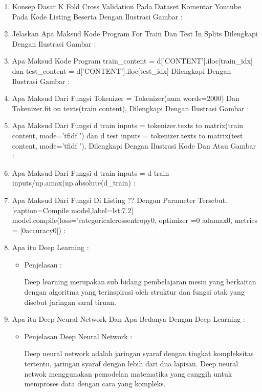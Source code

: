 \begin{enumerate}
\par
\par
\item Konsep Dasar K Fold Cross Validation Pada Dataset Komentar Youtube Pada Kode Listing Beserta Dengan Ilustrasi Gambar :
\item Jelaskan Apa Maksud Kode Program For Train Dan Test In Splits Dilengkapi Dengan Ilustrasi Gambar :
\item Apa Maksud Kode Program train\_content = d['CONTENT'].iloc[train\_idx] dan test\_content = d['CONTENT'].iloc[test\_idx] Dilengkapi Dengan Ilustrasi Gambar :
\item Apa Maksud Dari Fungsi Tokenizer = Tokenizer(num words=2000) Dan Tokenizer.fit on texts(train content), Dilengkapi Dengan Ilustrasi Gambar :
\item Apa Maksud Dari Fungsi d train inputs = tokenizer.texts to matrix(train content, mode=’tfidf ’) dan d test inputs = tokenizer.texts to matrix(test content, mode=’tfidf ’), Dilengkapi Dengan Ilustrasi Kode Dan Atau Gambar :
\item Apa Maksud Dari Fungsi d train inputs = d train inputs/np.amax(np.absolute(d\_train) :
\item Apa Maksud Dari Fungsi Di Listing ?? Dengan Parameter Tersebut. [caption=Compile model,label=lst:7.2] model.compile(loss=’categoricalcrossentropy0, optimizer =0 adamax0, metrics = [0accuracy0]) :
\par
\item Apa itu Deep Learning :
\begin{itemize}
\item Penjelasan :
\par Deep learning merupakan sub bidang pembelajaran mesin yang berkaitan dengan algoritma yang terinspirasi oleh struktur dan fungsi otak yang disebut jaringan saraf tiruan.
\par
\par
\par
\end{itemize}
\item Apa itu Deep Neural Network Dan Apa Bedanya Dengan Deep Learning :
\begin{itemize}
\item Penjelasan Deep Neural Network : 
\par Deep neural network adalah jaringan syaraf dengan tingkat kompleksitas tertentu, jaringan syaraf dengan lebih dari dua lapisan. Deep neural netwok menggunakan pemodelan matematika yang canggih untuk memproses data dengan cara yang kompleks.

\end{itemize}
\end{enumerate}
